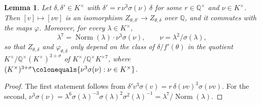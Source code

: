 \documentclass[12pt]{amsart}
\newcommand{\Q}{\mathbb{Q}}
\DeclareMathOperator{\Norm}{Norm}
\numberwithin{equation}{section}
\newtheorem{lemma}[theorem]{Lemma}
\theoremstyle{definition}
\begin{document}
\begin{lemma}
  \label{lem:twisting}
  Let $\delta,\delta' \in K^{\times}$ with $\delta' = r\,\nu^{3}\sigma(\nu)\,\delta$
  for some $r \in \Q^{\times}$ and $\nu \in K^{\times}$. Then $[v] \mapsto [\nu v]$
  is an isomorphism $Z_{\theta,\delta'} \to Z_{\theta,\delta}$ over $\Q$, and it
  commutes with the maps $\varphi$. Moreover, for every $\lambda \in K^{\times}$,
  \begin{equation}
    \label{eq:seventh-powers}
    \lambda^{7} = \Norm(\lambda)\cdot \nu^{3}\sigma(\nu),
    \qquad \nu = \lambda^{2}/\sigma(\lambda),
  \end{equation}
  so that $Z_{\theta,\delta}$ and $\varphi_{\theta,\delta}$ only depend on the
  class of $\delta/f'(\theta)$ in the quotient $K^{\times}/\Q^{\times}(K^{\times})^{3+\sigma}$ of
  $K^{\times}/\Q^{\times}K^{\times 7}$, where $(K^{\times})^{3+\sigma} \colonequals
  \{\nu^{3}\sigma(\nu) : \nu \in K^{\times}\}$.
\end{lemma}
\begin{proof}
  The first statement follows from $\delta'v^{3}\sigma(v) = r\,\delta(\nu
  v)^{3}\sigma(\nu v)$. For the second, $\nu^{3}\sigma(\nu) =
  \lambda^{6}\sigma(\lambda)^{-3}\sigma(\lambda)^{2}\sigma^{2}(\lambda)^{-1} = \lambda^{7}/\Norm(\lambda)$.
\end{proof}
\end{document}
